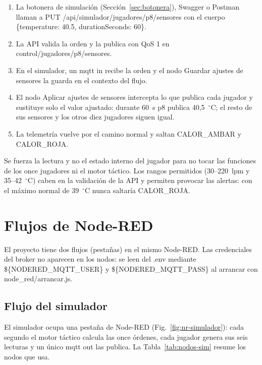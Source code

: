 \documentclass[runningheads]{llncs}
\begin{document}
\begin{enumerate}
  \item La botonera de simulación (Sección~\ref{sec:botonera}), Swagger o Postman llaman a PUT /api/simulador/jugadores/p8/sensores con el cuerpo \{temperature: 40.5, durationSeconds: 60\}.
  \item La API valida la orden y la publica con QoS 1 en control/jugadores/p8/sensores.
  \item En el simulador, un mqtt in recibe la orden y el nodo Guardar ajustes de sensores la guarda en el contexto del flujo.
  \item El nodo Aplicar ajustes de sensores intercepta lo que publica cada jugador y sustituye solo el valor ajustado: durante 60~s p8 publica 40,5~$^\circ$C; el resto de sus sensores y los otros diez jugadores siguen igual.
  \item La telemetría vuelve por el camino normal y saltan CALOR\_AMBAR y CALOR\_ROJA.
\end{enumerate}

Se fuerza la lectura y no el estado interno del jugador para no tocar las funciones de los once jugadores ni el motor táctico. Los rangos permitidos (30--220~lpm y 35--42~$^\circ$C) caben en la validación de la API y permiten provocar las alertas: con el máximo normal de 39~$^\circ$C nunca saltaría CALOR\_ROJA.

\section{Flujos de Node-RED}

El proyecto tiene dos flujos (pestañas) en el mismo Node-RED. Las credenciales del broker no aparecen en los nodos: se leen del .env mediante \$\{NODERED\_MQTT\_USER\} y \$\{NODERED\_MQTT\_PASS\} al arrancar con node\_red/arrancar.js.

\subsection{Flujo del simulador}

El simulador ocupa una pestaña de Node-RED (Fig.~\ref{fig:nr-simulador}): cada segundo el motor táctico calcula las once órdenes, cada jugador genera sus seis lecturas y un único mqtt out las publica. La Tabla~\ref{tab:nodos-sim} resume los nodos que usa.
\end{document}
